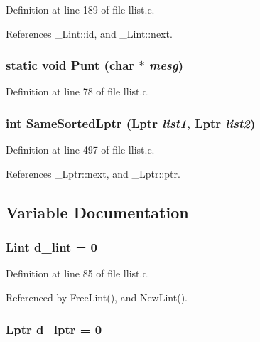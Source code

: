 Definition at line 189 of file llist.c.

References \_\-Lint::id, and \_\-Lint::next.
\subsubsection{\setlength{\rightskip}{0pt plus 5cm}static void Punt (char $\ast$ {\em mesg})\hspace{0.3cm}{\tt  [static]}}\label{llist_8c_5e4a7703cc8669ffef811a7f4a99562f}




Definition at line 78 of file llist.c.
\subsubsection{\setlength{\rightskip}{0pt plus 5cm}int Same\-Sorted\-Lptr (\bf{Lptr} {\em list1}, \bf{Lptr} {\em list2})}\label{llist_8c_afe3aa0b11464c10bcf9e796c39a74c4}




Definition at line 497 of file llist.c.

References \_\-Lptr::next, and \_\-Lptr::ptr.

\subsection{Variable Documentation}
\subsubsection{\setlength{\rightskip}{0pt plus 5cm}\bf{Lint} \bf{d\_\-lint} = 0\hspace{0.3cm}{\tt  [static]}}\label{llist_8c_f5ce8b1a2a9aab626f5cffb7c11de2c0}




Definition at line 85 of file llist.c.

Referenced by Free\-Lint(), and New\-Lint().
\subsubsection{\setlength{\rightskip}{0pt plus 5cm}\bf{Lptr} \bf{d\_\-lptr} = 0\hspace{0.3cm}{\tt  [static]}}\label{llist_8c_b05130f08347a00425107e306b772310}




